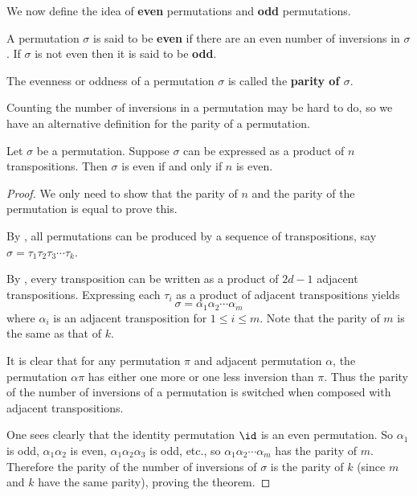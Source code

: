 We now define the idea of \textbf{even} permutations and \textbf{odd} permutations.
\begin{definition}
    A permutation $\sigma$ is said to be \textbf{even} if there are an even number of inversions in $\sigma$. If $\sigma$ is not even then it is said to be \textbf{odd}.
\end{definition}
The evenness or oddness of a permutation $\sigma$ is called the \textbf{parity of $\sigma$}.

Counting the number of inversions in a permutation may be hard to do, so we have an alternative definition for the parity of a permutation.

\begin{theorem}\label{thrm-parity-of-permutation}
    Let $\sigma$ be a permutation. Suppose $\sigma$ can be expressed as a product of $n$ transpositions. Then $\sigma$ is even if and only if $n$ is even.
\end{theorem}
\begin{proof}
    We only need to show that the parity of $n$ and the parity of the permutation is equal to prove this.

    By , all permutations can be produced by a sequence of transpositions, say $\sigma = \tau_1\tau_2\tau_3\cdots\tau_k$.

    By , every transposition can be written as a product of $2d - 1$ adjacent transpositions. Expressing each $\tau_i$ as a product of adjacent transpositions yields
    \[
        \sigma = \alpha_1\alpha_2\cdots\alpha_m
    \]
    where $\alpha_i$ is an adjacent transposition for $1 \leq i \leq m$. Note that the parity of $m$ is the same as that of $k$.

    It is clear that for any permutation $\pi$ and adjacent permutation $\alpha$, the permutation $\alpha\pi$ has either one more or one less inversion than $\pi$. Thus the parity of the number of inversions of a permutation is switched when composed with adjacent transpositions.

    One sees clearly that the identity permutation $\id$ is an even permutation. So $\alpha_1$ is odd, $\alpha_1\alpha_2$ is even, $\alpha_1\alpha_2\alpha_3$ is odd, etc., so $\alpha_1\alpha_2\cdots\alpha_m$ has the parity of $m$. Therefore the parity of the number of inversions of $\sigma$ is the parity of $k$ (since $m$ and $k$ have the same parity), proving the theorem.
\end{proof}

